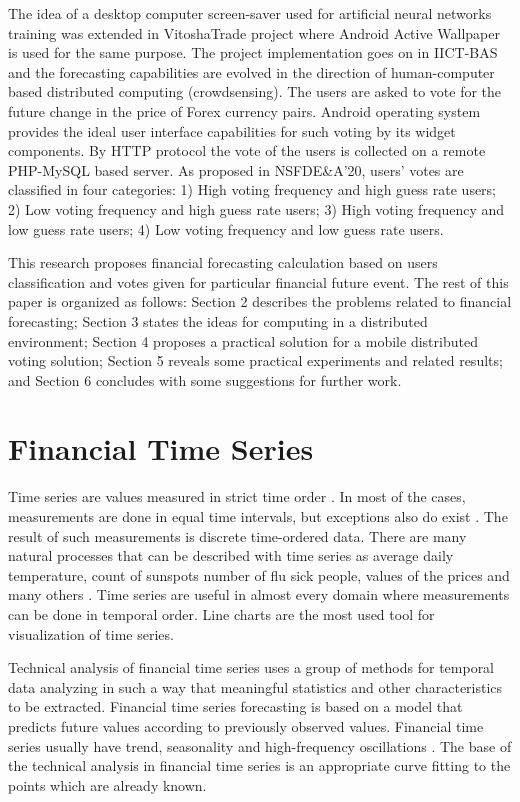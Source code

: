 \documentclass[runningheads]{llncs}
\begin{document}
The idea of a desktop computer screen-saver used for artificial neural networks training was extended in VitoshaTrade\cite{vitosha-trade-01} project where Android Active Wallpaper is used for the same purpose. The project implementation goes on in IICT-BAS and the forecasting capabilities are evolved in the direction of human-computer based distributed computing (crowdsensing\cite{crowdsensing-01}). The users are asked to vote\cite{voting-01} for the future change in the price of Forex currency pairs. Android operating system provides the ideal user interface capabilities for such voting by its widget components. By HTTP protocol the vote of the users is collected on a remote PHP-MySQL based server. As proposed in NSFDE\&A'20, users' votes are classified in four categories: 1) High voting frequency and high guess rate users; 2) Low voting frequency and high guess rate users; 3) High voting frequency and low guess rate users; 4) Low voting frequency and low guess rate users.

This research proposes financial forecasting calculation based on users classification and votes given for particular financial future event. The rest of this paper is organized as follows: Section 2 describes the problems related to financial forecasting; Section 3 states the ideas for computing in a distributed environment; Section 4 proposes a practical solution for a mobile distributed voting solution; Section 5 reveals some practical experiments and related results; and Section 6 concludes with some suggestions for further work.
%
\section{Financial Time Series}
%
Time series are values measured in strict time order \cite{time-series-01}. In most of the cases, measurements are done in equal time intervals, but exceptions also do exist \cite{time-series-02}. The result of such measurements is discrete time-ordered data. There are many natural processes that can be described with time series as average daily temperature, count of sunspots number of flu sick people, values of the prices and many others \cite{time-series-03}. Time series are useful in almost every domain where measurements can be done in temporal order. Line charts are the most used tool for visualization of time series. 

Technical analysis of financial time series uses a group of methods for temporal data analyzing in such a way that meaningful statistics and other characteristics to be extracted. Financial time series forecasting is based on a model that predicts future values according to previously observed values. Financial time series usually have trend, seasonality and high-frequency oscillations \cite{time-series-04}. The base of the technical analysis in financial time series is an appropriate curve fitting to the points which are already known.
%
\end{document}
